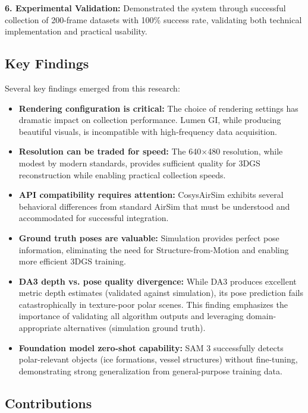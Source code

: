\textbf{6. Experimental Validation:} Demonstrated the system through successful collection of 200-frame datasets with 100\% success rate, validating both technical implementation and practical usability.

\subsection{Key Findings}

Several key findings emerged from this research:

\begin{itemize}
    \item \textbf{Rendering configuration is critical:} The choice of rendering settings has dramatic impact on collection performance. Lumen GI, while producing beautiful visuals, is incompatible with high-frequency data acquisition.

    \item \textbf{Resolution can be traded for speed:} The 640$\times$480 resolution, while modest by modern standards, provides sufficient quality for 3DGS reconstruction while enabling practical collection speeds.

    \item \textbf{API compatibility requires attention:} CosysAirSim exhibits several behavioral differences from standard AirSim that must be understood and accommodated for successful integration.

    \item \textbf{Ground truth poses are valuable:} Simulation provides perfect pose information, eliminating the need for Structure-from-Motion and enabling more efficient 3DGS training.

    \item \textbf{DA3 depth vs. pose quality divergence:} While DA3 produces excellent metric depth estimates (validated against simulation), its pose prediction fails catastrophically in texture-poor polar scenes. This finding emphasizes the importance of validating all algorithm outputs and leveraging domain-appropriate alternatives (simulation ground truth).

    \item \textbf{Foundation model zero-shot capability:} SAM 3 successfully detects polar-relevant objects (ice formations, vessel structures) without fine-tuning, demonstrating strong generalization from general-purpose training data.
\end{itemize}

\subsection{Contributions}

